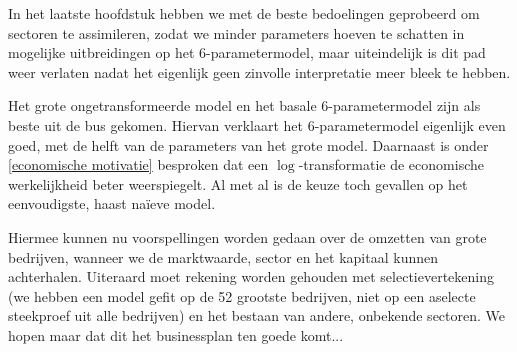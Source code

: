 \documentclass[a4paper]{report}
\begin{document}
  In het laatste hoofdstuk hebben we met de beste bedoelingen geprobeerd om sectoren te assimileren, zodat we minder parameters hoeven te schatten in mogelijke uitbreidingen op het 6-parametermodel, maar uiteindelijk is dit pad weer verlaten nadat het eigenlijk geen zinvolle interpretatie meer bleek te hebben.

  Het grote ongetransformeerde model en het basale 6-parametermodel zijn als beste uit de bus gekomen. Hiervan verklaart het 6-parametermodel eigenlijk even goed, met de helft van de parameters van het grote model. Daarnaast is onder \ref{economische motivatie} besproken dat een $\log$-transformatie de economische werkelijkheid beter weerspiegelt. Al met al is de keuze toch gevallen op het eenvoudigste, haast na\"ieve model.
  
  Hiermee kunnen nu voorspellingen worden gedaan over de omzetten van grote bedrijven, wanneer we de marktwaarde, sector en het kapitaal kunnen achterhalen. Uiteraard moet rekening worden gehouden met selectievertekening (we hebben een model gefit op de 52 grootste bedrijven, niet op een aselecte steekproef uit alle bedrijven) en het bestaan van andere, onbekende sectoren. We hopen maar dat dit het businessplan ten goede komt...
\end{document}
